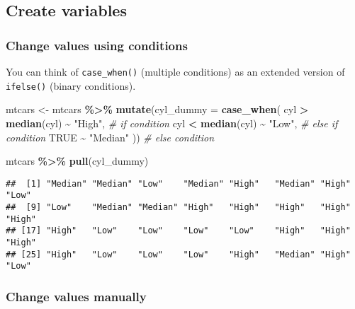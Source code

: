 \documentclass[
]{book}
\newenvironment{Shaded}{\begin{snugshade}}{\end{snugshade}}
\newcommand{\CommentTok}[1]{\textcolor[rgb]{0.56,0.35,0.01}{\textit{#1}}}
\newcommand{\DataTypeTok}[1]{\textcolor[rgb]{0.13,0.29,0.53}{#1}}
\newcommand{\KeywordTok}[1]{\textcolor[rgb]{0.13,0.29,0.53}{\textbf{#1}}}
\newcommand{\NormalTok}[1]{#1}
\newcommand{\OperatorTok}[1]{\textcolor[rgb]{0.81,0.36,0.00}{\textbf{#1}}}
\newcommand{\OtherTok}[1]{\textcolor[rgb]{0.56,0.35,0.01}{#1}}
\newcommand{\StringTok}[1]{\textcolor[rgb]{0.31,0.60,0.02}{#1}}
\begin{document}
\hypertarget{create-variables}{%
\subsection{Create variables}\label{create-variables}}

\hypertarget{change-values-using-conditions}{%
\subsubsection{Change values using conditions}\label{change-values-using-conditions}}

You can think of \texttt{case\_when()} (multiple conditions) as an extended version of \texttt{ifelse()} (binary conditions).

\begin{Shaded}
\begin{Highlighting}[]
\NormalTok{mtcars \textless{}{-}}\StringTok{ }\NormalTok{mtcars }\OperatorTok{\%\textgreater{}\%}
\StringTok{  }\KeywordTok{mutate}\NormalTok{(}\DataTypeTok{cyl\_dummy =} \KeywordTok{case\_when}\NormalTok{(}
\NormalTok{    cyl }\OperatorTok{\textgreater{}}\StringTok{ }\KeywordTok{median}\NormalTok{(cyl) }\OperatorTok{\textasciitilde{}}\StringTok{ "High"}\NormalTok{, }\CommentTok{\# if condition}
\NormalTok{    cyl }\OperatorTok{\textless{}}\StringTok{ }\KeywordTok{median}\NormalTok{(cyl) }\OperatorTok{\textasciitilde{}}\StringTok{ "Low"}\NormalTok{, }\CommentTok{\# else if condition}
    \OtherTok{TRUE} \OperatorTok{\textasciitilde{}}\StringTok{ "Median"}
\NormalTok{  )) }\CommentTok{\# else condition}

\NormalTok{mtcars }\OperatorTok{\%\textgreater{}\%}\StringTok{ }\KeywordTok{pull}\NormalTok{(cyl\_dummy)}
\end{Highlighting}
\end{Shaded}

\begin{verbatim}
##  [1] "Median" "Median" "Low"    "Median" "High"   "Median" "High"   "Low"   
##  [9] "Low"    "Median" "Median" "High"   "High"   "High"   "High"   "High"  
## [17] "High"   "Low"    "Low"    "Low"    "Low"    "High"   "High"   "High"  
## [25] "High"   "Low"    "Low"    "Low"    "High"   "Median" "High"   "Low"
\end{verbatim}

\hypertarget{change-values-manually}{%
\subsubsection{Change values manually}\label{change-values-manually}}
\end{document}

